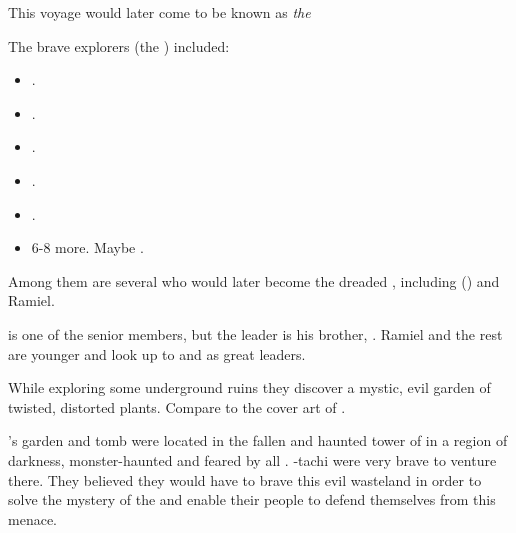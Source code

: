 This voyage would later come to be known as \emph{the \Delving}

The brave explorers (the \quo{\Delvers}) included: 

\begin{itemize}
  \item \Damiarch.
  \item \Gevural.
  \item \Zachirah.
  \item \Ramiel.
  \item \Shiaraid.
  \item 6-8 more. Maybe \Sithiyacaan.
\end{itemize}

Among them are several who would later become the dreaded \satharioth, including \Gevural{} (\Azraid{}) and Ramiel. 

\Gevural{} is one of the senior members, but the leader is his brother, \Damiarch. Ramiel and the rest are younger and look up to \Damiarch{} and \Gevural{} as great leaders. 

While exploring some underground ruins they discover a mystic, evil garden of twisted, distorted plants. 
Compare to the cover art of . 

\Semiza's garden and tomb were located in the fallen and haunted tower of \Jazerubel in a region of darkness, monster-haunted and feared by all \resphain.
\Damiarch-tachi were very brave to venture there.
They believed they would have to brave this evil wasteland in order to solve the mystery of the \umbrae and enable their people to defend themselves from this menace.


